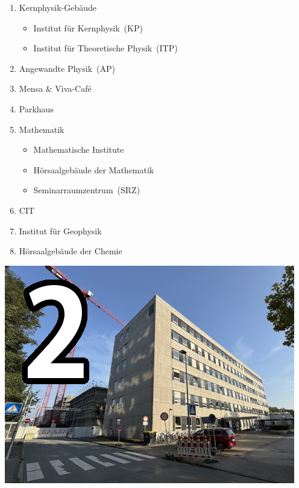 {\begin{minipage}{0.54\textwidth}
	\begin{enumerate}[resume*=lageplan]
		\item Kernphysik-Gebäude
		\begin{itemize}
			\item Institut für Kernphysik~(KP)
			\item Institut für Theoretische Physik~(ITP)
		\end{itemize}
		\item Angewandte Physik~(AP)
		\item Mensa \& Viva-Café
		\item Parkhaus
		\item Mathematik
		\begin{itemize}
			\item Mathematische Institute
			\item Hörsaalgebäude der Mathematik
			\item Seminarraumzentrum~(SRZ)
		\end{itemize}
		\item CIT
		\item Institut für Geophysik
		\item Hörsaalgebäude der Chemie
	\end{enumerate}
\end{minipage}
\hfill
\begin{minipage}{0.45\textwidth}
	\vspace{-0.5cm}
	\centering
	\includegraphics[width=\textwidth]{res/lageplan/2_KP_TP.jpg}
\end{minipage}

}
